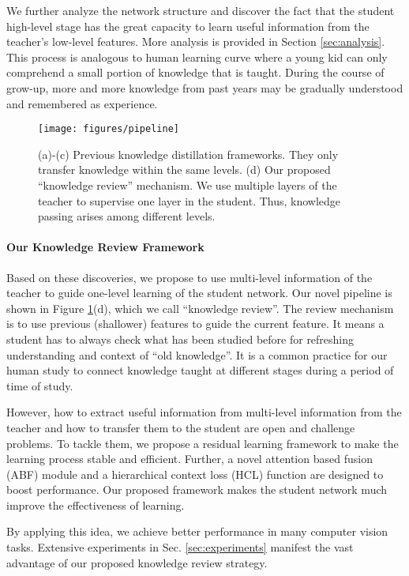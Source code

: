 \documentclass[final]{cvpr}
\begin{document}
We further analyze the network structure and discover the fact that the student high-level stage has the great capacity to learn useful information from the teacher's low-level features. More analysis is provided in Section \ref{sec:analysis}. This process is analogous to human learning curve \cite{learningcurve} where a young kid can only comprehend a small portion of knowledge that is taught. During the course of grow-up, more and more knowledge from past years may be gradually understood and remembered as experience.  

\begin{figure}[t]
	\centering
	\texttt{[image: figures/pipeline]}
	\caption{(a)-(c) Previous knowledge distillation frameworks. They only transfer knowledge within the same levels. (d) Our proposed ``knowledge review'' mechanism. We use multiple layers of the teacher to supervise one layer in the student. Thus, knowledge passing arises among different levels.}
	\label{fig:pipeline}
\end{figure}

\vspace{-0.1in} \paragraph{Our Knowledge Review Framework} Based on these discoveries, we propose to use multi-level information of the teacher to guide one-level learning of the student network. Our novel pipeline is shown in Figure \ref{fig:pipeline}(d), which we call ``knowledge review''. 
The review mechanism is to use previous (shallower) features to guide the current feature.
It means a student has to always check what has been studied before for refreshing understanding and context of ``old knowledge''. It is a common practice for our human study to connect knowledge taught at different stages during a period of time of study.

However, how to extract useful information from multi-level information from the teacher and how to transfer them to the student are open and challenge problems. To tackle them, we propose a residual learning framework to make the learning process stable and efficient. Further, a novel attention based fusion (ABF) module and a hierarchical context loss (HCL) function are designed to boost performance. Our proposed framework makes the student network much improve the effectiveness of learning. 

By applying this idea, we achieve better performance in many computer vision tasks.
Extensive experiments in Sec. \ref{sec:experiments} manifest the vast advantage of our proposed knowledge review strategy.
\end{document}
